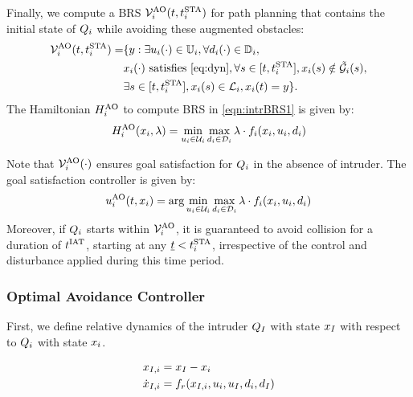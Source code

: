 Finally, we compute a BRS $\mathcal{V}^{\text{AO}}_{i}(t, t^\text{STA}_i)$ for path planning that contains the initial state of $Q_i$ while avoiding these augmented obstacles:
\begin{equation} \label{eqn:intrBRS1}
\begin{aligned}
\brs^{\text{AO}}_{i}(t, \sta_i) = & \{y: \exists \ctrl_i(\cdot) \in \cfset_i, \forall \dstb_i(\cdot) \in \dfset_i, \\
& \state_i(\cdot) \text{ satisfies \eqref{eq:dyn}}, \forall s \in [t, \sta_i], \state_i(s) \notin \tilde\obsset_i(s), \\
& \exists s \in [t, \sta_i], \state_i(s) \in \targetset_i, \state_i(t) = y \}.
\end{aligned}
\end{equation}
The Hamiltonian $H^{\text{AO}}_{i}$ to compute BRS in \eqref{eqn:intrBRS1} is given by:
\begin{equation} \label{eqn:BRSham}
\ham^{\text{AO}}_{i}(\state_i, \costate) = \min_{\ctrl_i \in \cset_i} \max_{\dstb_i \in \dset_i} \costate \cdot f_i (\state_i, \ctrl_i, \dstb_i)
\end{equation}

Note that $\mathcal{V}^{\text{AO}}_{i}(\cdot)$ ensures goal satisfaction for $Q_i$ in the absence of intruder. The goal satisfaction controller is given by:
\begin{equation}
{u^{\text{AO}}_{i}}(t, x_i) = \arg \min_{u_i \in \mathcal{U}_i} \max_{d_i \in \mathcal{D}_i} \lambda \cdot f_i (x_i, u_i, d_i)
\end{equation}
Moreover, if $Q_i$ starts within $\mathcal{V}^{\text{AO}}_{i}$, it is guaranteed to avoid collision for a duration of $t^\text{IAT}$, starting at any $\underline{t} < t^\text{STA}_i$, irrespective of the control and disturbance applied during this time period. 

\subsubsection{Optimal Avoidance Controller} \label{sec:intruder_avoid}
First, we define relative dynamics of the intruder $Q_{I}$ with state $x_I$ with respect to $Q_i$ with state $x_i$.

\begin{equation}
\label{eq:reldyn}
\begin{aligned}
\state_{\intr, i} &= \state_\intr - \state_i \\
\dot \state_{\intr, i} &= f_r(\state_{\intr, i}, \ctrl_i, \ctrl_\intr, \dstb_i, \dstb_\intr)
\end{aligned}
\end{equation}


